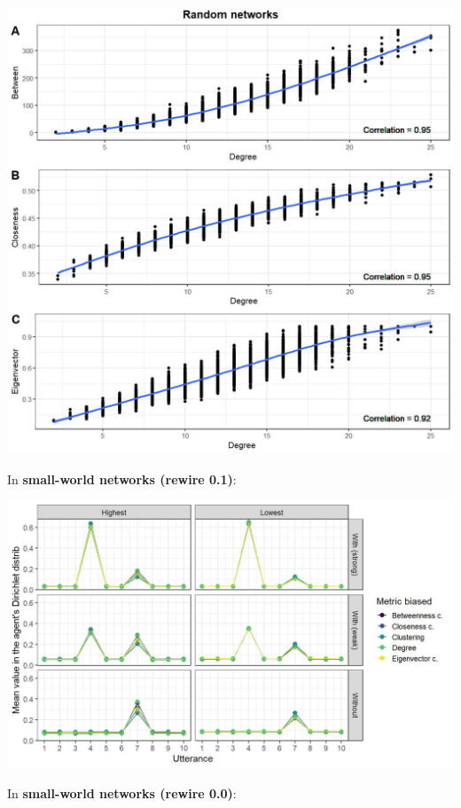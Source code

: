 \documentclass[
]{article}
\begin{document}
\begin{center}\includegraphics{./Figures/unnamed-chunk-193-1} \end{center}

In \textbf{small-world networks (rewire 0.1)}:

\begin{center}\includegraphics{./Figures/unnamed-chunk-194-1} \end{center}

In \textbf{small-world networks (rewire 0.0)}:
\end{document}
